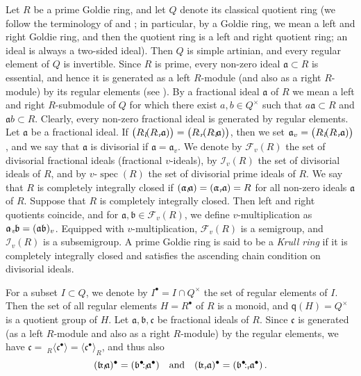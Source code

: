 \documentclass[a4paper]{amsart}
\theoremstyle{definition}
\numberwithin{equation}{section}
\begin{document}
Let $R$ be a prime Goldie ring, and let $Q$ denote its classical
quotient ring (we follow the terminology of \cite{Mc-Ro01a} and
\cite{Go-Wa04a}; in particular, by a Goldie ring, we mean a  left
and right Goldie ring, and then the quotient ring is a left and
right quotient ring; an ideal is always a two-sided ideal). Then $Q$
is simple artinian, and every regular element of $Q$ is invertible.
Since $R$ is prime, every non-zero ideal $\mathfrak a \subset R$ is
essential, and hence it is generated as a left $R$-module (and also
as a right $R$-module) by its regular elements (see \cite[Corollary
3.3.7]{Mc-Ro01a}). By a fractional ideal $\mathfrak a$ of $R$ we
mean a left and right $R$-submodule of $Q$ for which there exist $a,
b \in Q^{\times}$ such that $a \mathfrak a \subset R$ and $\mathfrak
a b \subset R$. Clearly, every non-zero fractional ideal is generated by
regular elements. Let  $\mathfrak a$ be a fractional ideal. If
$\big(R {\negthinspace :_l \negthinspace} (R {\negthinspace :_r \negthinspace} \mathfrak a) \big) = \big(R {\negthinspace :_r \negthinspace} (R {\negthinspace :_l \negthinspace}
\mathfrak a) \big)$, then we set $\mathfrak a_v = \big(R {\negthinspace :_l \negthinspace} (R
{\negthinspace :_r \negthinspace} \mathfrak a) \big)$, and we say that $\mathfrak a$ is
divisorial if $\mathfrak a = \mathfrak a_v$. We denote by $\mathcal
F_v (R)$ the set of divisorial fractional ideals (fractional
$v$-ideals),  by $\mathcal I_v (R)$ the set of divisorial ideals of
$R$, and by $v$-$\operatorname{spec} (R)$ the set of divisorial prime ideals of
$R$. We say that $R$ is completely integrally closed if $(\mathfrak
a {\negthinspace :_l \negthinspace} \mathfrak a) = (\mathfrak a {\negthinspace :_r \negthinspace} \mathfrak a) = R$ for all
non-zero ideals $\mathfrak a$ of $R$. Suppose that $R$ is completely
integrally closed. Then left and right quotients coincide, and for
$\mathfrak a, \mathfrak b \in \mathcal F_v (R)$, we define
$v$-multiplication as $\mathfrak a {\negthinspace \cdot_v \negthinspace} \mathfrak b = (\mathfrak a
\mathfrak b)_v$. Equipped with $v$-multiplication, $\mathcal F_v
(R)$ is a semigroup, and $\mathcal I_v (R)$ is a subsemigroup. A prime Goldie ring is
said to be a {\it Krull ring} if it is completely integrally closed and satisfies
the ascending chain condition on divisorial ideals.

For a subset $I \subset Q$, we denote by $I^{\bullet} = I \cap
Q^{\times}$ the set of regular elements of $I$.  Then the set of all
regular elements  $H = R^{\bullet}$ of $R$ is a monoid, and $\mathsf
q (H) = Q^{\times}$ is a quotient group of $H$. Let $\mathfrak a,
\mathfrak b, \mathfrak c  $ be fractional ideals of $R$. Since
$\mathfrak c$ is generated (as a  left $R$-module and also as a
right $R$-module) by the regular elements, we have $\mathfrak c = \
_R\langle \mathfrak c^{\bullet} \rangle = \langle \mathfrak
c^{\bullet} \rangle_R$, and thus also
\[
(\mathfrak b {\negthinspace :_l \negthinspace} \mathfrak a)^{\bullet} = (  \mathfrak b^{\bullet}
{\negthinspace :_l \negthinspace} \mathfrak a^{\bullet} ) \quad \text{and} \quad  (\mathfrak b
{\negthinspace :_r \negthinspace} \mathfrak a )^{\bullet}  =   (\mathfrak b^{\bullet} {\negthinspace :_r \negthinspace}
\mathfrak a^{\bullet})  \,.
\]
\end{document}
